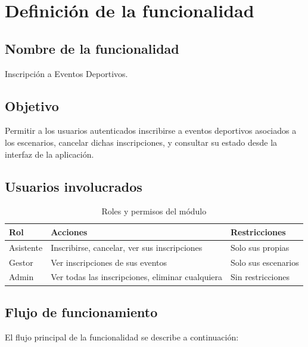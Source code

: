 
\section{Definici\'on de la funcionalidad}

\subsection{Nombre de la funcionalidad}

Inscripci\'on a Eventos Deportivos.

\subsection{Objetivo}

Permitir a los usuarios autenticados inscribirse a eventos deportivos
asociados a los escenarios, cancelar dichas inscripciones, y consultar
su estado desde la interfaz de la aplicaci\'on.

\subsection{Usuarios involucrados}

\begin{table}[H]
\centering
\begin{tabular}{@{}lll@{}}
\toprule
\textbf{Rol} & \textbf{Acciones} & \textbf{Restricciones} \\
\midrule
Asistente & Inscribirse, cancelar, ver sus inscripciones & Solo sus propias \\
Gestor & Ver inscripciones de sus eventos & Solo sus escenarios \\
Admin & Ver todas las inscripciones, eliminar cualquiera & Sin restricciones \\
\bottomrule
\end{tabular}
\caption{Roles y permisos del m\'odulo}
\end{table}

\subsection{Flujo de funcionamiento}

El flujo principal de la funcionalidad se describe a continuaci\'on:

